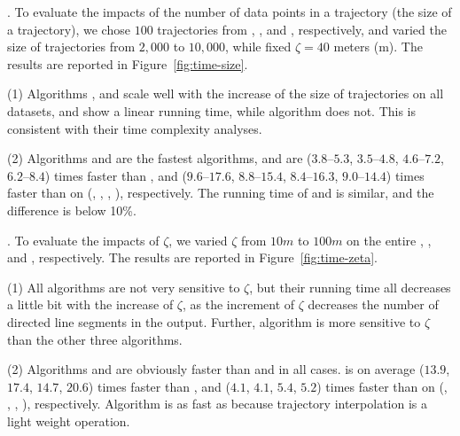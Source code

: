 .
To evaluate the impacts of the number of data points in a trajectory (\ie the size of a trajectory),
we chose $100$ trajectories from \taxi, \truck, \sercar and \geolife, respectively,
and varied the size  of trajectories from $2,000$ to $10,000$, while fixed $\zeta = 40$ meters (m).
The results are reported in Figure~\ref{fig:time-size}.

\sstab(1) Algorithms \operb, \operba and \fbqsa  scale well with the increase of the size of trajectories on all datasets,
and show a linear running time, while algorithm \dpa does not.
This is consistent with their time complexity analyses.

\sstab(2) Algorithms \operb and \operba are the fastest \lsa algorithms, and are {($3.8$--$5.3$, $3.5$--$4.8$, $4.6$--$7.2$, $6.2$--$8.4$)} times faster than \fbqsa,
and {($9.6$--$17.6$, $8.8$--$15.4$, $8.4$--$16.3$, $9.0$--$14.4$)} times faster than \dpa on (\taxi, \truck, \sercar, \geolife), respectively. The running time of \operb and \operba is similar, and the difference is below 10\%.

.
To evaluate the impacts of $\zeta$, we varied $\zeta$ from $10m$ to $100m$ on the entire \taxi, \truck, \sercar and \geolife, respectively.
The results are reported in Figure~\ref{fig:time-zeta}.


\sstab(1) All algorithms are not very sensitive to $\zeta$, but their running time all decreases a little bit with the increase of $\zeta$,
as the increment of $\zeta$ decreases the number of directed line segments in the output.
Further, algorithm \dpa is more sensitive to $\zeta$ than the other three algorithms.

\sstab(2) Algorithms \operb and \operba are obviously faster than \dpa and \fbqsa in all cases.
\operb is on average ($13.9$, $17.4$, $14.7$, {$20.6$}) times faster than \dpa, and ($4.1$, $4.1$, $5.4$, {$5.2$}) times faster than \fbqsa on (\taxi, \truck, \sercar, {\geolife}), respectively. Algorithm \operba is as fast as \operb because trajectory interpolation is a light weight operation.







